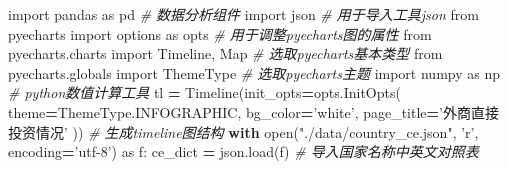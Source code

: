 \documentclass[]{ctexart}
\newenvironment{Shaded}{\begin{snugshade}}{\end{snugshade}}
\newcommand{\BuiltInTok}[1]{#1}
\newcommand{\CommentTok}[1]{\textcolor[rgb]{0.56,0.35,0.01}{\textit{#1}}}
\newcommand{\ControlFlowTok}[1]{\textcolor[rgb]{0.13,0.29,0.53}{\textbf{#1}}}
\newcommand{\ImportTok}[1]{#1}
\newcommand{\NormalTok}[1]{#1}
\newcommand{\OperatorTok}[1]{\textcolor[rgb]{0.81,0.36,0.00}{\textbf{#1}}}
\newcommand{\StringTok}[1]{\textcolor[rgb]{0.31,0.60,0.02}{#1}}
\begin{document}
\begin{Shaded}
\begin{Highlighting}[]
\ImportTok{import}\NormalTok{ pandas }\ImportTok{as}\NormalTok{ pd                                   }\CommentTok{# 数据分析组件}
\ImportTok{import}\NormalTok{ json                                           }\CommentTok{# 用于导入工具json}
\ImportTok{from}\NormalTok{ pyecharts }\ImportTok{import}\NormalTok{ options }\ImportTok{as}\NormalTok{ opts                 }\CommentTok{# 用于调整pyecharts图的属性}
\ImportTok{from}\NormalTok{ pyecharts.charts }\ImportTok{import}\NormalTok{ Timeline, Map            }\CommentTok{# 选取pyecharts基本类型}
\ImportTok{from}\NormalTok{ pyecharts.}\BuiltInTok{globals} \ImportTok{import}\NormalTok{ ThemeType               }\CommentTok{# 选取pyecharts主题}
\ImportTok{import}\NormalTok{ numpy }\ImportTok{as}\NormalTok{ np                                    }\CommentTok{# python数值计算工具}
\NormalTok{tl }\OperatorTok{=}\NormalTok{ Timeline(init_opts}\OperatorTok{=}\NormalTok{opts.InitOpts(}
\NormalTok{    theme}\OperatorTok{=}\NormalTok{ThemeType.INFOGRAPHIC,}
\NormalTok{    bg_color}\OperatorTok{=}\StringTok{'white'}\NormalTok{,}
\NormalTok{    page_title}\OperatorTok{=}\StringTok{'外商直接投资情况'}
\NormalTok{))                                                    }\CommentTok{# 生成timeline图结构}
\ControlFlowTok{with} \BuiltInTok{open}\NormalTok{(}\StringTok{"./data/country_ce.json"}\NormalTok{, }\StringTok{'r'}\NormalTok{, encoding}\OperatorTok{=}\StringTok{'utf-8'}\NormalTok{) }\ImportTok{as}\NormalTok{ f:}
\NormalTok{    ce_dict }\OperatorTok{=}\NormalTok{ json.load(f)                            }\CommentTok{# 导入国家名称中英文对照表}


\end{Highlighting}
\end{Shaded}
\end{document}
